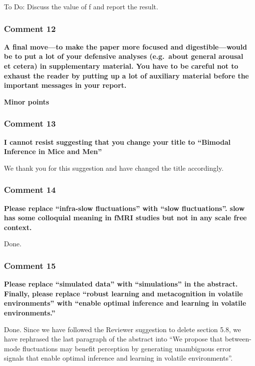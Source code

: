 \documentclass[
]{article}
\begin{document}
To Do: Discuss the value of f and report the result.

\hypertarget{comment-12}{%
\subsubsection{Comment 12}\label{comment-12}}

\textbf{A final move---to make the paper more focused and
digestible---would be to put a lot of your defensive analyses
(e.g.~about general arousal et cetera) in supplementary material. You
have to be careful not to exhaust the reader by putting up a lot of
auxiliary material before the important messages in your report.}

\textbf{Minor points}

\hypertarget{comment-13}{%
\subsubsection{Comment 13}\label{comment-13}}

\textbf{I cannot resist suggesting that you change your title to
``Bimodal Inference in Mice and Men''}

We thank you for this suggestion and have changed the title accordingly.

\hypertarget{comment-14}{%
\subsubsection{Comment 14}\label{comment-14}}

\textbf{Please replace ``infra-slow fluctuations'' with ``slow
fluctuations''. slow has some colloquial meaning in fMRI studies but not
in any scale free context.}

Done.

\hypertarget{comment-15}{%
\subsubsection{Comment 15}\label{comment-15}}

\textbf{Please replace ``simulated data'' with ``simulations'' in the
abstract. Finally, please replace ``robust learning and metacognition in
volatile environments'' with ``enable optimal inference and learning in
volatile environments.''}

Done. Since we have followed the Reviewer suggestion to delete section
5.8, we have rephrased the last paragraph of the abstract into ``We
propose that between-mode fluctuations may benefit perception by
generating unambiguous error signals that enable optimal inference and
learning in volatile environments''.
\end{document}
